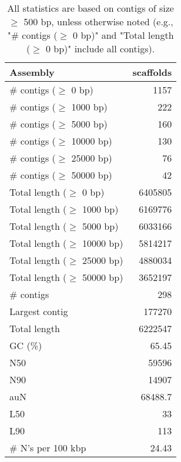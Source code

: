 \documentclass[12pt,a4paper]{article}
\begin{document}
\begin{table}[ht]
\begin{center}
\caption{All statistics are based on contigs of size $\geq$ 500 bp, unless otherwise noted (e.g., "\# contigs ($\geq$ 0 bp)" and "Total length ($\geq$ 0 bp)" include all contigs).}
\begin{tabular}{|l*{1}{|r}|}
\hline
Assembly & scaffolds \\ \hline
\# contigs ($\geq$ 0 bp) & 1157 \\ \hline
\# contigs ($\geq$ 1000 bp) & 222 \\ \hline
\# contigs ($\geq$ 5000 bp) & 160 \\ \hline
\# contigs ($\geq$ 10000 bp) & 130 \\ \hline
\# contigs ($\geq$ 25000 bp) & 76 \\ \hline
\# contigs ($\geq$ 50000 bp) & 42 \\ \hline
Total length ($\geq$ 0 bp) & 6405805 \\ \hline
Total length ($\geq$ 1000 bp) & 6169776 \\ \hline
Total length ($\geq$ 5000 bp) & 6033166 \\ \hline
Total length ($\geq$ 10000 bp) & 5814217 \\ \hline
Total length ($\geq$ 25000 bp) & 4880034 \\ \hline
Total length ($\geq$ 50000 bp) & 3652197 \\ \hline
\# contigs & 298 \\ \hline
Largest contig & 177270 \\ \hline
Total length & 6222547 \\ \hline
GC (\%) & 65.45 \\ \hline
N50 & 59596 \\ \hline
N90 & 14907 \\ \hline
auN & 68488.7 \\ \hline
L50 & 33 \\ \hline
L90 & 113 \\ \hline
\# N's per 100 kbp & 24.43 \\ \hline
\end{tabular}
\end{center}
\end{table}
\end{document}
